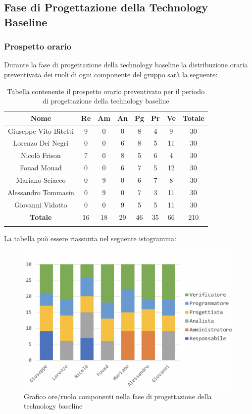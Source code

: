 	\subsection{Fase di Progettazione della Technology Baseline}
		\subsubsection{Prospetto orario}
		Durante la fase di progettazione della technology baseline la distribuzione oraria preventivata dei ruoli di ogni componente del gruppo sarà la seguente:
		
		\begin{longtable}{|c|c|c|c|c|c|c|c|}
			\hline
			\rowcolor{lighter-grayer}
			\textbf{Nome} & \textbf{Re} & \textbf{Am} & \textbf{An} & \textbf{Pg}  & \textbf{Pr}   & \textbf{Ve} & \textbf{Totale} \\
			\hline
			\endfirsthead
			
			\hline
			Giuseppe Vito Bitetti 		& 9 & 0 & 0 & 8 & 4 & 9 & 30\\
			\hline
			\hline
			Lorenzo Dei Negri			& 0 & 0 & 6 & 8 & 5 & 11 & 30\\
			\hline
			\hline
			Nicolò Frison				   & 7 & 0 & 8 & 5 & 6 & 4 & 30\\
			\hline
			\hline
			Fouad Mouad 				& 0 & 0 & 6 & 7 & 5 & 12 & 30\\
			\hline
			\hline
			Mariano Sciacco 			& 0 & 9 & 0 & 6 & 7 & 8 & 30\\
			\hline
			\hline
			Alessandro Tommasin    & 0 & 9 & 0 & 7 & 3 & 11 & 30\\
			\hline
			\hline
			Giovanni Vidotto 			& 0 & 0 & 9 & 5 & 5 & 11 & 30\\
			\hline 
			\textbf{Totale}			 & 16 &  18 & 29 & 46 & 35 & 66 & 210\\
			\hline
			\caption{Tabella contenente il prospetto orario preventivato per il periodo di progettazione della technology baseline}
		\end{longtable}
		\pagebreak
		
		La tabella può essere riassunta nel seguente istogramma:
		\begin{figure}[H]
			\centering
			\includegraphics[width=0.8\linewidth]{./images/progArch1.png}
			\caption{Grafico ore/ruolo componenti nella fase di progettazione della technology baseline}
			\label{fig:grafico suddivione ruoli fase progettazione della technology baseline}
		\end{figure}
	
